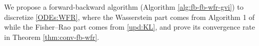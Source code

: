 \documentclass[11pt]{article}
\theoremstyle{plain}
\theoremstyle{definition}
\theoremstyle{remark}
\newcommand{\E}{\mathbb{E}}
\newcommand{\post}{\mathrm{post}}
\begin{document}

We propose a forward-backward algorithm (Algorithm \ref{alg:fb-fb-wfr-gvi}) to discretize \eqref{ODEs:WFR}, where the Wasserstein part comes from Algorithm 1 of \cite{diao2023forward} while the Fisher--Rao part comes from \eqref{upd:KL}, and prove its convergence rate in Theorem \ref{thm:conv-fb-wfr}.
\end{document}
